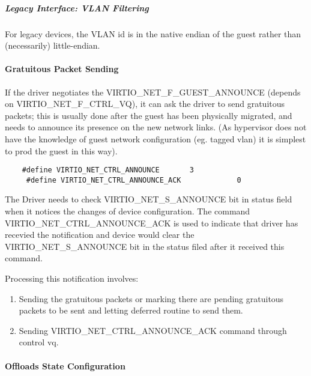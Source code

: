 \subparagraph{Legacy Interface: VLAN Filtering}\label{sec:Device Types / Network Device / Device Operation / Control Virtqueue / VLAN Filtering / Legacy Interface: VLAN Filtering}
For legacy devices, the VLAN id is in the
native endian of the guest rather than (necessarily) little-endian.

\paragraph{Gratuitous Packet Sending}\label{sec:Device Types / Network Device / Device Operation / Control Virtqueue / Gratuitous Packet Sending}

If the driver negotiates the VIRTIO_NET_F_GUEST_ANNOUNCE (depends
on VIRTIO_NET_F_CTRL_VQ), it can ask the driver to send gratuitous
packets; this is usually done after the guest has been physically
migrated, and needs to announce its presence on the new network
links. (As hypervisor does not have the knowledge of guest
network configuration (eg. tagged vlan) it is simplest to prod
the guest in this way).

\begin{lstlisting}
	#define VIRTIO_NET_CTRL_ANNOUNCE       3
	 #define VIRTIO_NET_CTRL_ANNOUNCE_ACK             0
\end{lstlisting}

The Driver needs to check VIRTIO_NET_S_ANNOUNCE bit in status
field when it notices the changes of device configuration. The
command VIRTIO_NET_CTRL_ANNOUNCE_ACK is used to indicate that
driver has recevied the notification and device would clear the
VIRTIO_NET_S_ANNOUNCE bit in the status filed after it received
this command.

Processing this notification involves:

\begin{enumerate}
\item Sending the gratuitous packets or marking there are pending
  gratuitous packets to be sent and letting deferred routine to
  send them.

\item Sending VIRTIO_NET_CTRL_ANNOUNCE_ACK command through control
  vq.
\end{enumerate}

\paragraph{Offloads State Configuration}\label{sec:Device Types / Network Device / Device Operation / Control Virtqueue / Offloads State Configuration}

